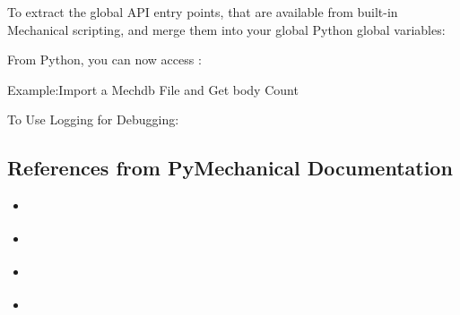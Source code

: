 \documentclass[9pt,landscape]{article}
\begin{document}
\begin{multicols}{3}
To extract the global API entry points, that are available from built-in Mechanical scripting, and merge them into your global Python global variables:


From Python, you can now access : 
 


Example:Import a Mechdb File and Get body Count


To Use Logging for Debugging:


\subsection{References from PyMechanical Documentation}
\begin{itemize}
    \item \href{https://mechanical.docs.pyansys.com/version/stable/getting_started/index.html}{\color{blue}{Getting Started}}
    \item \href{https://mechanical.docs.pyansys.com/version/stable/examples/index.html}{\color{blue}{Examples}}
    \item \href{https://mechanical.docs.pyansys.com/version/stable/api/index.html}{\color{blue}{API Reference}}
    \item \href{https://ansyshelp.ansys.com/account/secured?returnurl=/Views/Secured/corp/v231/en/act_script/act_script.html}{\color{blue}{Scripting in Mechanical}}
\end{itemize}
\end{multicols}
\end{document}
